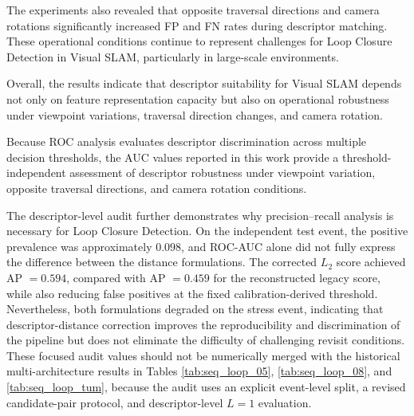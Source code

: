 \documentclass{ieeeaccess}
\newenvironment{revisionblock}
{%
  \par
  \begingroup
  \setlength{\fboxsep}{1pt}%
  \setlength{\OuterFrameSep}{0pt}%
  \def\FrameCommand##1{%
    \colorbox{white}{\color{revisionred}##1}%
  }%
  \MakeFramed{%
    \advance\hsize-2\fboxsep
    \FrameRestore
  }%
}
{%
  \endMakeFramed
  \endgroup
  \par
}
\renewenvironment{revisionblock}
  {\par\begingroup\color{revisionred}}
  {\par\endgroup}
\begin{document}
The experiments also revealed that opposite traversal directions and camera rotations significantly increased FP and FN rates during descriptor matching. These operational conditions continue to represent challenges for Loop Closure Detection in Visual SLAM, particularly in large-scale environments.

Overall, the results indicate that descriptor suitability for Visual SLAM depends not only on feature representation capacity but also on operational robustness under viewpoint variations, traversal direction changes, and camera rotation.

Because ROC analysis evaluates descriptor discrimination across multiple decision thresholds, the AUC values reported in this work provide a threshold-independent assessment of descriptor robustness under viewpoint variation, opposite traversal directions, and camera rotation conditions.

\begin{revisionblock}
The descriptor-level audit further demonstrates why precision--recall analysis is necessary for Loop Closure Detection. On the independent test event, the positive prevalence was approximately $0.098$, and ROC-AUC alone did not fully express the difference between the distance formulations. The corrected $L_2$ score achieved AP $=0.594$, compared with AP $=0.459$ for the reconstructed legacy score, while also reducing false positives at the fixed calibration-derived threshold. Nevertheless, both formulations degraded on the stress event, indicating that descriptor-distance correction improves the reproducibility and discrimination of the pipeline but does not eliminate the difficulty of challenging revisit conditions. These focused audit values should not be numerically merged with the historical multi-architecture results in Tables \ref{tab:seq_loop_05}, \ref{tab:seq_loop_08}, and \ref{tab:seq_loop_tum}, because the audit uses an explicit event-level split, a revised candidate-pair protocol, and descriptor-level $L=1$ evaluation.
\end{revisionblock}
\end{document}
